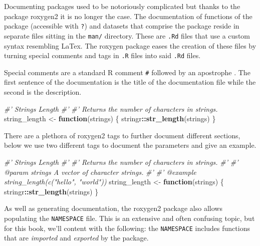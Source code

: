 \documentclass[10pt,]{krantz}
\makeatletter
\newenvironment{Shaded}{\begin{snugshade}}{\end{snugshade}}
\newcommand{\CommentTok}[1]{\textcolor[rgb]{0.37,0.37,0.37}{\textit{#1}}}
\newcommand{\ControlFlowTok}[1]{\textcolor[rgb]{0.27,0.27,0.27}{\textbf{#1}}}
\newcommand{\KeywordTok}[1]{\textcolor[rgb]{0.27,0.27,0.27}{\textbf{#1}}}
\newcommand{\NormalTok}[1]{#1}
\newcommand{\OperatorTok}[1]{\textcolor[rgb]{0.43,0.43,0.43}{\textbf{#1}}}
\newcommand{\StringTok}[1]{\textcolor[rgb]{0.5,0.5,0.5}{#1}}
\newenvironment{kframe}{%
\medskip{}
\setlength{\fboxsep}{.8em}
 \def\at@end@of@kframe{}%
 \ifinner\ifhmode%
  \def\at@end@of@kframe{\end{minipage}}%
  \begin{minipage}{\columnwidth}%
 \fi\fi%
 \def\FrameCommand##1{\hskip\@totalleftmargin \hskip-\fboxsep
 \colorbox{shadecolor}{##1}\hskip-\fboxsep
     \hskip-\linewidth \hskip-\@totalleftmargin \hskip\columnwidth}%
 \MakeFramed {\advance\hsize-\width
   \@totalleftmargin\z@ \linewidth\hsize
   \@setminipage}}%
 {\par\unskip\endMakeFramed%
 \at@end@of@kframe}
\renewenvironment{Shaded}{\begin{kframe}}{\end{kframe}}
\makeatother
\begin{document}
Documenting packages used to be notoriously complicated but thanks to the package roxygen2 it is no longer the case. The documentation of functions of the package (accessible with \texttt{?}) and datasets that comprise the package reside in separate files sitting in the \texttt{man/} directory. These are \texttt{.Rd} files that use a custom syntax resembling LaTex. The roxygen package eases the creation of these files by turning special comments and tags in \texttt{.R} files into said \texttt{.Rd} files.

Special comments are a standard R comment \texttt{\#} followed by an apostrophe \texttt{\textquotesingle{}}. The first sentence of the documentation is the title of the documentation file while the second is the description.

\begin{Shaded}
\begin{Highlighting}[]
\CommentTok{#' Strings Length}
\CommentTok{#' }
\CommentTok{#' Returns the number of characters in strings. }
\NormalTok{string_length <-}\StringTok{ }\ControlFlowTok{function}\NormalTok{(strings) \{}
\NormalTok{  stringr}\OperatorTok{::}\KeywordTok{str_length}\NormalTok{(strings)}
\NormalTok{\}}
\end{Highlighting}
\end{Shaded}

There are a plethora of roxygen2 tags to further document different sections, below we use two different tags to document the parameters and give an example.

\begin{Shaded}
\begin{Highlighting}[]
\CommentTok{#' Strings Length}
\CommentTok{#' }
\CommentTok{#' Returns the number of characters in strings. }
\CommentTok{#' }
\CommentTok{#' @param strings A vector of character strings.}
\CommentTok{#' }
\CommentTok{#' @example string_length(c("hello", "world"))}
\NormalTok{string_length <-}\StringTok{ }\ControlFlowTok{function}\NormalTok{(strings) \{}
\NormalTok{  stringr}\OperatorTok{::}\KeywordTok{str_length}\NormalTok{(strings)}
\NormalTok{\}}
\end{Highlighting}
\end{Shaded}

As well as generating documentation, the roxygen2 package also allows populating the \texttt{NAMESPACE} file. This is an extensive and often confusing topic, but for this book, we'll content with the following: the \texttt{NAMESPACE} includes functions that are \emph{imported} and \emph{exported} by the package.
\end{document}
